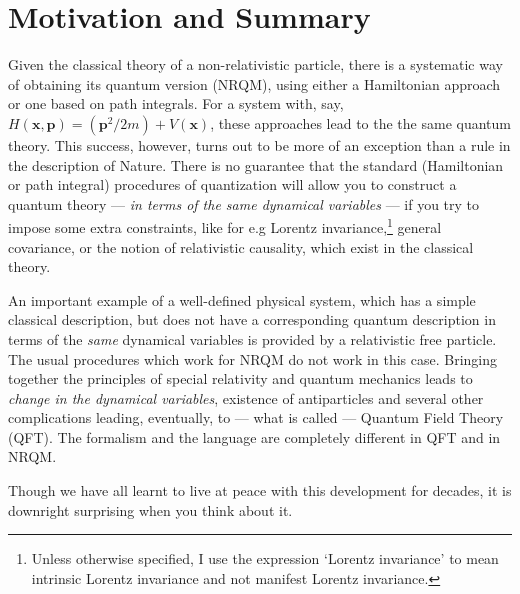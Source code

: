 \documentclass[12pt]{article}
\begin{document}
\section{Motivation and Summary}



Given the classical theory of a non-relativistic particle, there is  a systematic way of obtaining its quantum version (NRQM), using either  a Hamiltonian approach or one based on  path integrals. For a system with, say, $H(\bm{x},\bm{p})=(\bm{p}^2/2m) + V(\bm{x})$,  these approaches lead to the the same quantum theory.
This success, however, turns out to be more of an exception than a rule in the description of Nature.   There is  no guarantee that the standard (Hamiltonian or path integral) procedures of quantization  will allow you to construct a quantum theory --- \textit{in terms of the same dynamical variables} --- if you try to impose  some   extra  constraints, like for e.g Lorentz invariance,\footnote{Unless otherwise specified, I use the expression `Lorentz invariance' to mean intrinsic Lorentz invariance and not manifest Lorentz invariance.} general covariance, or the notion of relativistic causality, which exist in the classical theory. 

An important example of a well-defined physical system, 
which has a simple classical description, but does not have a corresponding quantum description in terms of the \textit{same} dynamical variables
is provided by a relativistic free particle.
The usual procedures which work for NRQM do not work  in this case.  
Bringing together the principles of special relativity and quantum mechanics leads to \textit{change in the dynamical variables}, existence of antiparticles and several other complications leading, eventually, to --- what is called --- Quantum Field Theory (QFT). The formalism and the language are completely different in QFT and in NRQM. 
 
Though we have all learnt to live at peace with this development for decades, it is downright surprising  when you think about it. 
\end{document}

